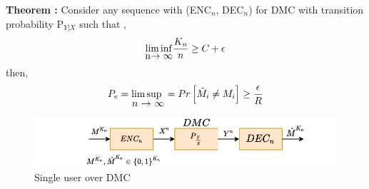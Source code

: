 \documentclass{article}
\begin{document}
\textbf{Theorem :} Consider any sequence with (ENC$_{n}$, DEC$_{n}$) for DMC with transition probability P$_{Y|X}$ such that ,\\
\begin{eqnarray*}
 \stackunder{$\liminf$}{n$\rightarrow \infty$} \frac{K_n}{n} \geq C + \epsilon
 \end{eqnarray*}
 then, 
 \begin{eqnarray*}
 	 P_{e} = \stackunder{$\limsup$ }{$n$ $\rightarrow$ $\infty$} =  Pr \left [ \hat{M}_{i} \neq M_{i} \right ] \geq \frac{\epsilon}{R}
 \end{eqnarray*} 
 \begin{figure}[h!]
  \centering
 \includegraphics[height=.10\textheight]{pic6.pdf}
 \caption{ Single user over DMC }
 \label{fig11.1}
 \end{figure}
 
\end{document}
